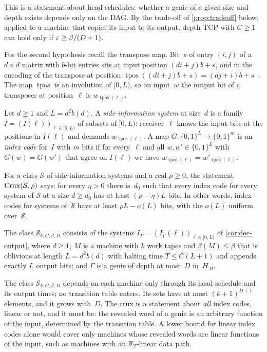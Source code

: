 This is a statement about head schedules: whether a genie of a given size and depth exists depends only on the DAG.
By the trade-off of \cref{prop:tradeoff} below, applied to a machine that copies its input to its output, depth-TCP
with $C\ge1$ can hold only if $\varepsilon\ge\beta/(D+1)$.

For the second hypothesis recall the transpose map. Bit~$s$ of entry $(i,j)$ of a $d\times d$ matrix with $b$-bit
entries sits at input position $(di+j)b+s$, and in the encoding of the transpose at position
$\operatorname{tpos}((di+j)b+s)=(dj+i)b+s$~\cite[Section~2.2 and Lemma~2.5]{FirstPaper2026}. The map $\operatorname{tpos}$ is an involution of
$[0,L)$, so on input~$w$ the output bit of a transposer at position~$\ell$ is $w_{\operatorname{tpos}(\ell)}$.

\begin{definition}\label{def:crux}
Let $d\ge1$ and $L=d^2b(d)$. A \emph{side-information system} at size~$d$ is a family $I=(I(\ell))_{\ell\in[0,L)}$
of subsets of $[0,L)$: receiver~$\ell$ knows the input bits at the positions in $I(\ell)$ and demands
$w_{\operatorname{tpos}(\ell)}$. A map $G\colon\{0,1\}^L\to\{0,1\}^m$ is an \emph{index code} for~$I$ with $m$ bits
if for every~$\ell$ and all $w,w'\in\{0,1\}^L$ with $G(w)=G(w')$ that agree on $I(\ell)$ we have
$w_{\operatorname{tpos}(\ell)}=w'_{\operatorname{tpos}(\ell)}$.

For a class $\mathcal S$ of side-information systems and a real $\rho\ge0$, the statement $\mathrm{Crux}(\mathcal S,\rho)$
says: for every $\eta>0$ there is~$d_0$ such that every index code for every system of $\mathcal S$ at a size
$d\ge d_0$ has at least $(\rho-\eta)L$ bits. In other words, index codes for systems of~$\mathcal S$ have at least
$\rho L-o(L)$ bits, with the $o(L)$ uniform over~$\mathcal S$.

The class $\mathcal S_{k,C,\beta,D}$ consists of the systems $I_\Gamma=(I_\Gamma(\ell))_{\ell\in[0,L)}$ of
\cref{cor:dec-output}, where $d\ge1$; $M$ is a machine with $k$ work tapes and $\beta(M)\le\beta$ that is oblivious
at length $L=d^2b(d)$ with halting time $T\le C(L+1)$ and appends exactly $L$ output bits; and $\Gamma$ is a genie
of depth at most~$D$ in~$H_M$.
\end{definition}

The class $\mathcal S_{k,C,\beta,D}$ depends on each machine only through its head schedule and its output times; no
transition table enters. Its sets have at most $(k+1)^{D+1}$ elements, and it grows with~$D$. The crux is a statement
about \emph{all} index codes, linear or not, and it must be: the revealed word of a genie is an arbitrary function of
the input, determined by the transition table. A lower bound for linear index codes alone would cover only machines
whose revealed words are linear functions of the input, such as machines with an $\mathbb{F}_2$-linear data path.

